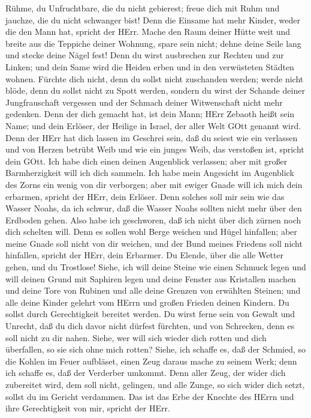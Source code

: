  Rühme, du Unfruchtbare, die du nicht gebierest; freue dich
mit Ruhm und jauchze, die du nicht schwanger bist! Denn die Einsame hat
mehr Kinder, weder die den Mann hat, spricht der HErr. 
Mache den Raum deiner Hütte weit und breite aus die Teppiche deiner
Wohnung, spare sein nicht; dehne deine Seile lang und stecke deine Nägel
fest!  Denn du wirst ausbrechen zur Rechten und zur Linken;
und dein Same wird die Heiden erben und in den verwüsteten Städten
wohnen.  Fürchte dich nicht, denn du sollst nicht zuschanden
werden; werde nicht blöde, denn du sollst nicht zu Spott werden, sondern
du wirst der Schande deiner Jungfrauschaft vergessen und der Schmach
deiner Witwenschaft nicht mehr gedenken.  Denn der dich
gemacht hat, ist dein Mann; HErr Zebaoth heißt sein Name; und dein
Erlöser, der Heilige in Israel, der aller Welt GOtt genannt wird.
 Denn der HErr hat dich lassen im Geschrei sein, daß du
seiest wie ein verlassen und von Herzen betrübt Weib und wie ein junges
Weib, das verstoßen ist, spricht dein GOtt.  Ich habe dich
einen deinen Augenblick verlassen; aber mit großer Barmherzigkeit will
ich dich sammeln.  Ich habe mein Angesicht im Augenblick des
Zorns ein wenig von dir verborgen; aber mit ewiger Gnade will ich mich
dein erbarmen, spricht der HErr, dein Erlöser.  Denn solches
soll mir sein wie das Wasser Noahs, da ich schwur, daß die Wasser Noahs
sollten nicht mehr über den Erdboden gehen. Also habe ich geschworen,
daß ich nicht über dich zürnen noch dich schelten will. 
Denn es sollen wohl Berge weichen und Hügel hinfallen; aber meine Gnade
soll nicht von dir weichen, und der Bund meines Friedens soll nicht
hinfallen, spricht der HErr, dein Erbarmer.  Du Elende,
über die alle Wetter gehen, und du Trostlose! Siehe, ich will deine
Steine wie einen Schmuck legen und will deinen Grund mit Saphiren legen
 und deine Fenster aus Kristallen machen und deine Tore von
Rubinen und alle deine Grenzen von erwählten Steinen;  und
alle deine Kinder gelehrt vom HErrn und großen Frieden deinen Kindern.
 Du sollst durch Gerechtigkeit bereitet werden. Du wirst
ferne sein von Gewalt und Unrecht, daß du dich davor nicht dürfest
fürchten, und von Schrecken, denn es soll nicht zu dir nahen.
 Siehe, wer will sich wieder dich rotten und dich
überfallen, so sie sich ohne mich rotten?  Siehe, ich
schaffe es, daß der Schmied, so die Kohlen im Feuer aufbläset, einen
Zeug daraus mache zu seinem Werk; denn ich schaffe es, daß der Verderber
umkommt.  Denn aller Zeug, der wider dich zubereitet wird,
dem soll nicht, gelingen, und alle Zunge, so sich wider dich setzt,
sollst du im Gericht verdammen. Das ist das Erbe der Knechte des HErrn
und ihre Gerechtigkeit von mir, spricht der HErr.


